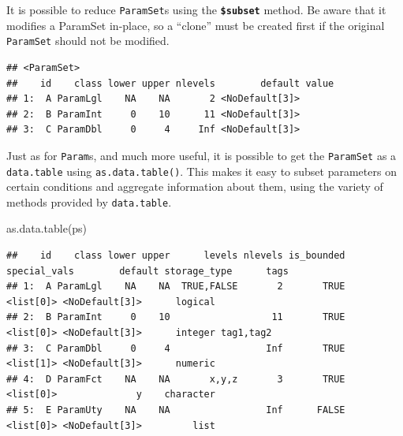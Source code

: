 \documentclass[
]{scrbook}
\newenvironment{Shaded}{\begin{snugshade}}{\end{snugshade}}
\newcommand{\FunctionTok}[1]{\textcolor[rgb]{0.00,0.00,0.00}{#1}}
\newcommand{\NormalTok}[1]{#1}
\newcommand{\OtherTok}[1]{\textcolor[rgb]{0.56,0.35,0.01}{#1}}
\newcommand{\SpecialCharTok}[1]{\textcolor[rgb]{0.00,0.00,0.00}{#1}}
\newcommand{\StringTok}[1]{\textcolor[rgb]{0.31,0.60,0.02}{#1}}
\renewenvironment{Shaded} {\begin{snugshade}\small} {\end{snugshade}}
\begin{document}
It is possible to reduce \texttt{ParamSet}s using the \textbf{\texttt{\$subset}} method.
Be aware that it modifies a ParamSet in-place, so a ``clone'' must be created first if the original \texttt{ParamSet} should not be modified.

\begin{Shaded}
\end{Shaded}

\begin{verbatim}
## <ParamSet>
##    id    class lower upper nlevels        default value
## 1:  A ParamLgl    NA    NA       2 <NoDefault[3]>      
## 2:  B ParamInt     0    10      11 <NoDefault[3]>      
## 3:  C ParamDbl     0     4     Inf <NoDefault[3]>
\end{verbatim}

Just as for \texttt{Param}s, and much more useful, it is possible to get the \texttt{ParamSet} as a \texttt{data.table} using \texttt{as.data.table()}.
This makes it easy to subset parameters on certain conditions and aggregate information about them, using the variety of methods provided by \texttt{data.table}.

\begin{Shaded}
\begin{Highlighting}[]
\FunctionTok{as.data.table}\NormalTok{(ps)}
\end{Highlighting}
\end{Shaded}

\begin{verbatim}
##    id    class lower upper      levels nlevels is_bounded special_vals        default storage_type      tags
## 1:  A ParamLgl    NA    NA  TRUE,FALSE       2       TRUE    <list[0]> <NoDefault[3]>      logical          
## 2:  B ParamInt     0    10                  11       TRUE    <list[0]> <NoDefault[3]>      integer tag1,tag2
## 3:  C ParamDbl     0     4                 Inf       TRUE    <list[1]> <NoDefault[3]>      numeric          
## 4:  D ParamFct    NA    NA       x,y,z       3       TRUE    <list[0]>              y    character          
## 5:  E ParamUty    NA    NA                 Inf      FALSE    <list[0]> <NoDefault[3]>         list
\end{verbatim}
\end{document}
